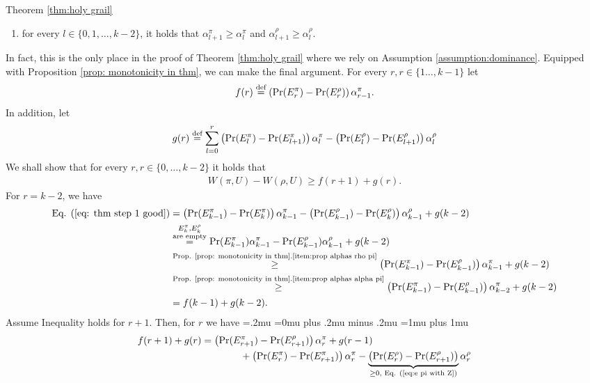 \begin{proofof}{Theorem \ref{thm:holy grail}}
\begin{proposition}
\begin{enumerate}
\item for every $l\in \{0,1,\dots,k-2\}$, it holds that $\alpha^\pi_{l+1} \geq \alpha^\pi_{l}$ and $\alpha^\rho_{l+1} \geq \alpha^\rho_{l}$. \label{item:prop alphas alpha pi}
\end{enumerate}
\end{proposition}
In fact, this is the only place in the proof of Theorem \ref{thm:holy grail} where we rely on Assumption \ref{assumption:dominance}. Equipped with Proposition \ref{prop: monotonicity in thm}, we can make the final argument. For every $r,r\in \{1\dots,k-1\}$ let
\[
f(r) \stackrel{\text{def}}{=} \left( \Pr(E^\pi_{r})-\Pr(E^\rho_{r}) \right)\alpha^\pi_{r-1}.
\]
In addition, let
\[
g(r)\stackrel{\text{def}}{=} \sum_{l=0}^{r}\left(\Pr(E^\pi_{l})-\Pr(E^\pi_{l+1})\right) \alpha^\pi_l-\left(\Pr(E^\rho_{l})-\Pr(E^\rho_{l+1})\right) \alpha^\rho_l
\]
We shall show that for every $r,r\in \{0,\dots,k-2\}$ it holds that
\begin{align}\label{eq:thm last argument}
W(\pi,U)-W(\rho,U)\geq f(r+1)+g(r).
\end{align}
For $r=k-2$, we have
{
\begin{align*}
\textnormal{Eq. (\ref{eq: thm step 1 good})}&=\left(\Pr(E^\pi_{k-1})-\Pr(E^\pi_{k})\right) \alpha^\pi_{k-1}-\left(\Pr(E^\rho_{k-1})-\Pr(E^\rho_{k})\right) \alpha^\rho_{k-1}+g(k-2)\\
&\stackrel{\substack{E^\pi_{k},E^\rho_{k}\\\textnormal{are empty}}}{=}\Pr(E^\pi_{k-1})\alpha^\pi_{k-1}-\Pr(E^\rho_{k-1}) \alpha^\rho_{k-1}+g(k-2)\\
&\stackrel{\textnormal{Prop. \ref{prop: monotonicity in thm}.\ref{item:prop alphas rho pi}}}{\geq}\left(\Pr(E^\pi_{k-1})-\Pr(E^\rho_{k-1}) \right)\alpha^\pi_{k-1}+g(k-2)\\
&\stackrel{\textnormal{Prop. \ref{prop: monotonicity in thm}.\ref{item:prop alphas alpha pi}}}{\geq}\left(\Pr(E^\pi_{k-1})-\Pr(E^\rho_{k-1}) \right)\alpha^\pi_{k-2}+g(k-2)\\
&=f(k-1)+g(k-2).
\end{align*}}%
Assume Inequality  holds for $r+1$. Then, for $r$ we have 
{\thinmuskip=.2mu
\medmuskip=0mu plus .2mu minus .2mu
\thickmuskip=1mu plus 1mu
\begin{align*}
f(r+1)+g(r) &= \left( \Pr(E^\pi_{r+1})-\Pr(E^\rho_{r+1}) \right)\alpha^\pi_{r}+g(r-1)\\
&\qquad \qquad +\left(\Pr(E^\pi_{r})-\Pr(E^\pi_{r+1})\right) \alpha^\pi_r-\underbrace{\left(\Pr(E^\rho_{r})-\Pr(E^\rho_{r+1})\right)}_{\geq 0,\textnormal{ Eq. \refeq{eq:e pi with Z}}}  \alpha^\rho_r\\

\end{align*}}
\end{proofof}
